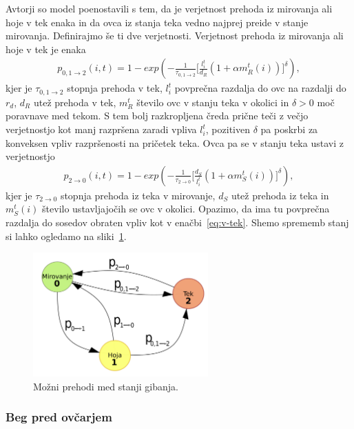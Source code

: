 Avtorji so model poenostavili s tem, da je verjetnost prehoda iz mirovanja ali hoje v tek enaka in da ovca iz stanja teka vedno najprej preide v stanje mirovanja. Definirajmo še ti dve verjetnosti.
Verjetnost prehoda iz mirovanja ali hoje v tek je enaka
\begin{align}
p_{0,1\rightarrow2}(i, t)=1 - exp(-\frac{1}{\tau_{0,1\rightarrow 2}}\lbrack \frac{l_i^t}{d_R}(1+\alpha m_R^t(i))\rbrack^\delta), \label{eq:v-tek}
\end{align}
kjer je $\tau_{0,1\rightarrow 2}$ stopnja prehoda v tek, $l_i^t$ povprečna razdalja do ovc na razdalji do $r_d$, $d_R$ utež prehoda v tek, $m_R^t$ število ovc v stanju teka v okolici in $\delta>0$ moč poravnave med tekom. S tem bolj razkropljena čreda prične teči z večjo verjetnostjo kot manj razpršena zaradi vpliva $l_i^t$, pozitiven $\delta$ pa poskrbi za konveksen vpliv razpršenosti na pričetek teka. Ovca pa se v stanju teka ustavi z verjetnostjo
\begin{align}
p_{2\rightarrow0}(i, t)=1 - exp(-\frac{1}{\tau_{2\rightarrow 0}}\lbrack \frac{d_S}{l_i^t}(1+\alpha m_S^t(i))\rbrack^\delta), \label{eq:iz-teka}
\end{align}
kjer je $\tau_{2\rightarrow 0}$ stopnja prehoda iz teka v mirovanje, $d_S$ utež prehoda iz teka in $m_S^t(i)$ število ustavljajočih se ovc v okolici. Opazimo, da ima tu povprečna razdalja do sosedov obraten vpliv kot v enačbi~\eqref{eq:v-tek}.
Shemo sprememb stanj si lahko ogledamo na sliki~\ref{fig:ginelli-stanja}.

\begin{figure}[ht]  %
	\centering
	\includegraphics[width=0.6\textwidth]{../poglavja/images/prehodi.pdf}
	\caption[Možni prehodi med stanji gibanja]{Možni prehodi med stanji gibanja.} %
	\label{fig:ginelli-stanja}
\end{figure}

\subsubsection{Beg pred ovčarjem}


